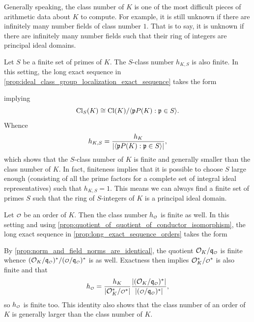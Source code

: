     Generally speaking, the class number of \(K\) is one of the most difficult pieces of arithmetic data about \(K\) to compute. For example, it is still unknown if there are infinitely many number fields of class number \(1\). That is to say, it is unknown if there are infinitely many number fields such that their ring of integers are principal ideal domains.

    Let \(S\) be a finite set of primes of \(K\). The \(S\)-class number \(h_{K,S}\) is also finite. In this setting, the long exact sequence in \cref{prop:ideal_class_group_localization_exact_sequence} takes the form
    \begin{center}
    \end{center}
    implying
    \[
      \operatorname{\mathrm{Cl}}_{S}(K) \cong \operatorname{\mathrm{Cl}}(K)/\langle\mathfrak{p}P(K):\mathfrak{p} \in S\rangle.
    \]
    Whence
    \[
      h_{K,S} = \frac{h_{K}}{|\langle\mathfrak{p}P(K):\mathfrak{p} \in S\rangle|},
    \]
    which shows that the \(S\)-class number of \(K\) is finite and generally smaller than the class number of \(K\). In fact, finiteness implies that it is possible to choose \(S\) large enough (consisting of all the prime factors for a complete set of integral ideal representatives) such that \(h_{K,S} = 1\). This means we can always find a finite set of primes \(S\) such that the ring of \(S\)-integers of \(K\) is a principal ideal domain.

    Let \(\smc{O}\) be an order of \(K\). Then the class number \(h_{\smc{O}}\) is finite as well. In this setting and using \cref{prop:quotient_of_quotient_of_conductor_isomorphism}, the long exact sequence in \cref{prop:long_exact_sequence_orders} takes the form
    \begin{center}
      \end{center}
    By \cref{prop:norm_and_field_norms_are_identical}, the quotient \(\mc{O}_{K}/\mf{q}_{\smc{O}}\) is finite whence \((\mc{O}_{K}/\mf{q}_{\smc{O}})^{\ast}/(\smc{O}/\mf{q}_{\smc{O}})^{\ast}\) is as well. Exactness then implies \(\mc{O}_{K}^{\ast}/\smc{O}^{\ast}\) is also finite and that
    \[
      h_{\smc{O}} = \frac{h_{K}}{|\mc{O}_{K}^{\ast}/\smc{O}^{\ast}|}\frac{|(\mc{O}_{K}/\mf{q}_{\smc{O}})^{\ast}|}{|(\smc{O}/\mf{q}_{\smc{O}})^{\ast}|},
    \]
    so \(h_{\smc{O}}\) is finite too. This identity also shows that the class number of an order of \(K\) is generally larger than the class number of \(K\).
